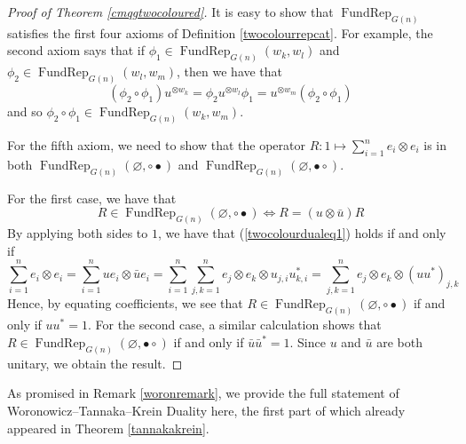 \documentclass{article}
\DeclareMathOperator{\FundRep}{FundRep}
\theoremstyle{plain}
\theoremstyle{definition}
\theoremstyle{remark}
\begin{document}
\begin{proof}[Proof of Theorem \ref{cmqgtwocoloured}]
	It is easy to show that $\FundRep_{G(n)}$ satisfies the
	first four axioms of Definition \ref{twocolourrepcat}.
	For example, the second axiom says that if 
	$\phi_1 \in \FundRep_{G(n)}(w_k, w_l)$ and
	$\phi_2 \in \FundRep_{G(n)}(w_l, w_m)$, then we have that
	\begin{equation}
		(\phi_2 \circ \phi_1){u^{\otimes w_k}}
		=
		\phi_2{u^{\otimes w_l}}\phi_1
		=
		{u^{\otimes w_m}}(\phi_2 \circ \phi_1)
	\end{equation}
	and so $\phi_2 \circ \phi_1 \in \FundRep_{G(n)}(w_k, w_m)$.

	For the fifth axiom, we need to show that the operator
	$R : 1 \mapsto \sum_{i=1}^{n} e_i \otimes e_i$
	is in both $\FundRep_{G(n)}(\varnothing, \circ\bullet)$
	and $\FundRep_{G(n)}(\varnothing, \bullet\circ)$.

	For the first case, we have that 
	\begin{equation} \label{twocolourdualeq1}
	R \in \FundRep_{G(n)}(\varnothing, \circ\bullet)
		\iff
	R = (u \otimes \bar{u})R
	\end{equation}
	By applying both sides to 
	$1$, we have that (\ref{twocolourdualeq1}) holds if and only if
	\begin{equation}
		\sum_{i=1}^{n} e_i \otimes e_i 
		=
		\sum_{i=1}^{n} ue_i \otimes \bar{u}e_i
		=
		\sum_{i=1}^{n} \sum_{j,k=1}^{n} e_j \otimes e_k \otimes u_{j,i}u_{k,i}^{*}
		=	
		\sum_{j,k=1}^{n} e_j \otimes e_k \otimes (uu^*)_{j,k}
	\end{equation}
	Hence, by equating coefficients, we see that
	$R \in \FundRep_{G(n)}(\varnothing, \circ\bullet)$ if and only if
	$uu^* = 1$.
	For the second case, a similar calculation shows that
	$R \in \FundRep_{G(n)}(\varnothing, \bullet\circ)$ if and only if
	$\bar{u}\bar{u}^* = 1$.
	Since $u$ and $\bar{u}$ are both unitary, we obtain the result.
\end{proof}

As promised in Remark \ref{woronremark},
we provide the full statement of Woronowicz--Tannaka--Krein Duality
\citep{woronowicz1988} here, the first part of which already appeared in
Theorem \ref{tannakakrein}.
\end{document}
